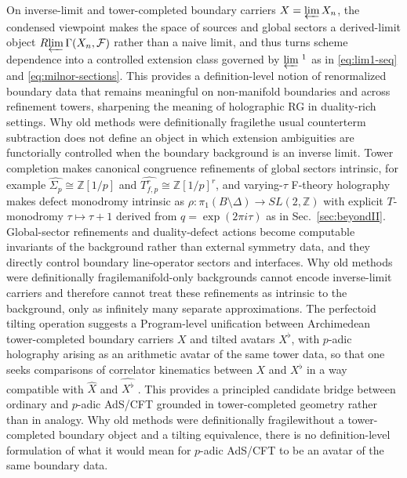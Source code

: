 \documentclass[11pt]{article}
\theoremstyle{remark}
\newcommand{\Z}{\mathbb{Z}}
\begin{document}
On inverse-limit and tower-completed boundary carriers \(X=\varprojlim X_n\), the condensed viewpoint makes the space of sources and global sectors a derived-limit object \(R\!\varprojlim \Gamma(X_n,\mathcal{F})\) rather than a naive limit, and thus turns scheme dependence into a controlled extension class governed by \(\varprojlim{}^{\,1}\) as in \eqref{eq:lim1-seq} and \eqref{eq:milnor-sections}. This provides a definition-level notion of renormalized boundary data that remains meaningful on non-manifold boundaries and across refinement towers, sharpening the meaning of holographic RG in duality-rich settings. Why old methods were definitionally fragile\:the usual counterterm subtraction does not define an object in which extension ambiguities are functorially controlled when the boundary background is an inverse limit. Tower completion makes canonical congruence refinements of global sectors intrinsic, for example \(\widehat{\Sigma_{p}}\cong \Z[1/p]\) and \(\widehat{T^{r}_{f,p}}\cong \Z[1/p]^{r}\), and varying-\(\tau\) F-theory holography makes defect monodromy intrinsic as \(\rho:\pi_{1}(B\setminus\Delta)\to SL(2,\Z)\) with explicit \(T\)-monodromy \(\tau\mapsto\tau+1\) derived from \(q=\exp(2\pi i\tau)\) as in Sec.~\ref{sec:beyondII}. Global-sector refinements and duality-defect actions become computable invariants of the background rather than external symmetry data, and they directly control boundary line-operator sectors and interfaces. Why old methods were definitionally fragile\:manifold-only backgrounds cannot encode inverse-limit carriers and therefore cannot treat these refinements as intrinsic to the background, only as infinitely many separate approximations. The perfectoid tilting operation suggests a Program-level unification between Archimedean tower-completed boundary carriers \(X\) and tilted avatars \(X^{\flat}\), with \(p\)-adic holography arising as an arithmetic avatar of the same tower data, so that one seeks comparisons of correlator kinematics between \(X\) and \(X^{\flat}\) in a way compatible with \(\widehat{X}\) and \(\widehat{X^{\flat}}\) \cite{Scholze2012, Gubser2017}. This provides a principled candidate bridge between ordinary and \(p\)-adic AdS/CFT grounded in tower-completed geometry rather than in analogy. Why old methods were definitionally fragile\:without a tower-completed boundary object and a tilting equivalence, there is no definition-level formulation of what it would mean for \(p\)-adic AdS/CFT to be an avatar of the same boundary data.
\end{document}
